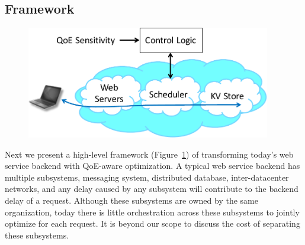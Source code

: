 
\subsection{Framework}
\label{subsec:framework}
\begin{figure}
	\centering
	\includegraphics[width=0.95\textwidth]{figs/framework.pdf}
	\caption{}
	\label{fig:framework}
\end{figure}
Next we present a high-level framework (Figure~\ref{fig:framework}) of transforming today's web service backend with QoE-aware optimization.
A typical web service backend has multiple subsystems, \eg messaging system, distributed database, inter-datacenter networks, and any delay caused by any subsystem will contribute to the backend delay of a request.
Although these subsystems are owned by the same organization, today there is little orchestration across these subsystems to jointly optimize for each request. 
It is beyond our scope to discuss the cost of separating these subsystems. 



